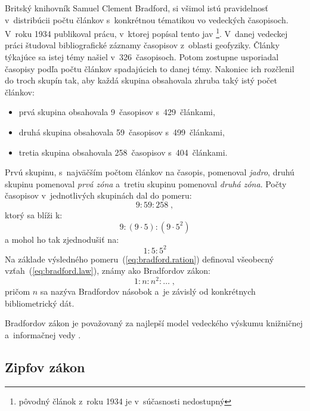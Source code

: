 Britský knihovník Samuel Clement Bradford, si všimol istú pravidelnosť
v~distribúcii počtu článkov s~konkrétnou tématikou vo vedeckých časopisoch.
V~roku 1934 publikoval prácu, v~ktorej popísal tento jav \citep{Bradford1985}%
\footnote{pôvodný článok z~roku 1934 je v~súčasnosti nedostupný}.  V~danej vedeckej
práci študoval bibliografické záznamy časopisov z~oblasti geofyziky.  Články
týkajúce sa istej témy našiel v~326~časopisoch.  Potom zostupne usporiadal
časopisy podľa počtu článkov spadajúcich to danej témy.  Nakoniec ich rozčlenil
do troch skupín tak, aby každá skupina obsahovala zhruba taký istý počet
článkov:

\begin{itemize}
\item prvá skupina obsahovala 9~časopisov s~429~článkami,
\item druhá skupina obsahovala 59~časopisov s~499~článkami,
\item tretia skupina obsahovala 258~časopisov s~404~článkami.
\end{itemize}
Prvú skupinu, s~najväčším počtom článkov na časopis, pomenoval \emph{jadro},
druhú skupinu pomenoval \emph{prvá zóna} a~tretiu skupinu pomenoval \emph{druhá
  zóna}.  Počty časopisov v~jednotlivých skupinách dal do pomeru:
\begin{equation*}
9 : 59 : 258 \;,
\end{equation*}
ktorý sa blíži k:
\begin{equation*}
9 : (9 \cdot 5) : (9 \cdot 5^2)
\end{equation*}
a mohol ho tak zjednodušiť na:
\begin{equation}
\label{eq:bradford.ration}
1 : 5 : 5^2
\end{equation}
Na základe výsledného pomeru~(\ref{eq:bradford.ration}) definoval všeobecný
vzťah~(\ref{eq:bradford.law}), známy ako Bradfordov zákon:
\begin{equation}
\label{eq:bradford.law}
1 : n : n^2 : \dotso \;,
\end{equation}
pričom $n$ sa nazýva Bradfordov násobok a~je závislý od konkrétnych
bibliometrický dát.

Bradfordov zákon je považovaný za najlepší model vedeckého výskumu knižničnej
a~informačnej vedy \citep[napr.][]{Nicolaisen2007}.


\subsection{Zipfov zákon}

